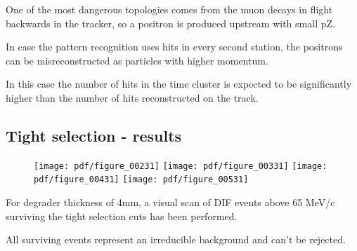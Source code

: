 One of the most dangerous topologies comes from the muon decays in flight backwards in the tracker,
so a positron is produced upstream with small pZ.

In case the pattern recognition uses hits in every second station, the positrons can be misreconstructed
as particles with higher momentum.

In this case the number of hits in the time cluster is expected to be significantly higher
than the number of hits reconstructed on the track.

\subsection{Tight selection - results}


\begin{figure}[H]
  \texttt{[image: pdf/figure\_00231]}
  \texttt{[image: pdf/figure\_00331]}
  \texttt{[image: pdf/figure\_00431]}
  \texttt{[image: pdf/figure\_00531]}
  \caption{
    \label{fig:deg_3mm_mom}
  }
\end{figure}

For degrader thickness of 4mm, a visual scan of DIF events above 65 MeV/c surviving
the tight selection cuts has been performed.

All surviving events represent an irreducible background and can't be rejected.

